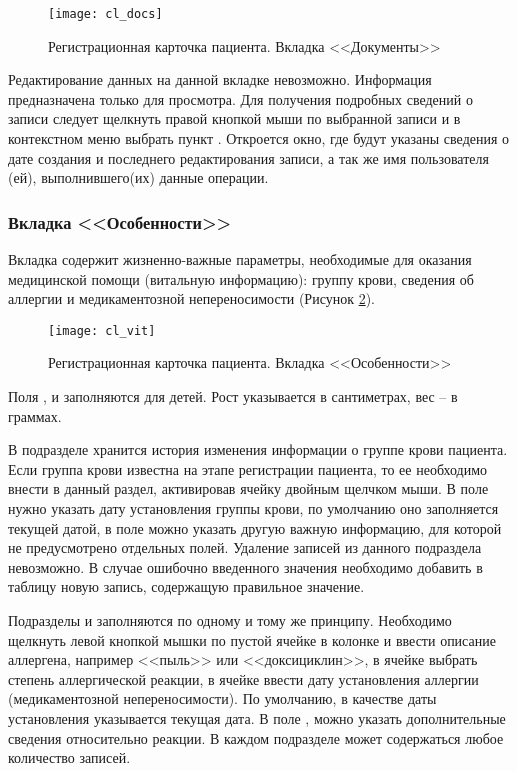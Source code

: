 \begin{figure}[ht]\centering
 \texttt{[image: cl\_docs]}
 \caption{Регистрационная карточка пациента. Вкладка <<Документы>>}
 \label{img_cl_docs}
\end{figure} 

Редактирование данных на данной вкладке невозможно. Информация предназначена только для просмотра. Для получения подробных сведений о записи следует щелкнуть правой кнопкой мыши по выбранной записи и в контекстном меню выбрать пункт . Откроется окно, где будут указаны сведения о дате создания и последнего редактирования записи, а так же имя пользователя (ей), выполнившего(их) данные операции.

\subsubsection{Вкладка <<Особенности>>}

Вкладка  содержит жизненно-важные параметры, необходимые для оказания медицинской помощи (витальную информацию): группу крови, сведения об аллергии и медикаментозной непереносимости (Рисунок \ref{img_cl_vit}). 

\begin{figure}[ht]\centering
 \texttt{[image: cl\_vit]}
 \caption{Регистрационная карточка пациента. Вкладка <<Особенности>>}
 \label{img_cl_vit}
\end{figure} 

 Поля ,  и  заполняются для детей. Рост указывается в сантиметрах, вес -- в граммах. 
 
 В подразделе  хранится история изменения информации о группе крови пациента. Если группа крови известна на этапе регистрации пациента, то ее необходимо внести в данный раздел, активировав ячейку  двойным щелчком мыши. В поле  нужно указать дату установления группы крови, по умолчанию оно заполняется текущей датой, в поле  можно указать другую важную информацию, для которой не предусмотрено отдельных полей. Удаление записей из данного подраздела невозможно. В случае ошибочно введенного значения необходимо добавить в таблицу новую запись, содержащую правильное значение.

Подразделы  и  заполняются по одному и тому же принципу. Необходимо щелкнуть левой кнопкой мышки по пустой ячейке в колонке  и ввести описание аллергена, например <<пыль>> или <<доксициклин>>, в ячейке  выбрать степень аллергической реакции, в ячейке  ввести дату установления аллергии (медикаментозной непереносимости). По умолчанию, в качестве даты установления указывается текущая дата. В поле , можно указать дополнительные сведения относительно реакции. В каждом подразделе может содержаться любое количество записей.

